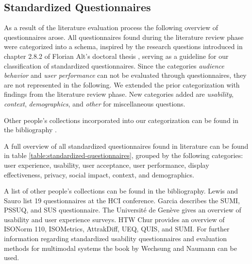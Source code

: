 \subsection{Standardized Questionnaires}
\label{section:questionnaires:categorization}

	As a result of the literature evaluation process the following overview of questionnaires arose. All questionnaires found during the literature review phase were categorized into a schema, inspired by the research questions introduced in chapter 2.8.2 of Florian Alt's doctoral thesis \cite{alt2013thesis}, serving as a guideline for our classification of standardized questionnaires. Since the categories \textit{audience behavior} and \textit{user performance} can not be evaluated through questionnaires, they are not represented in the following. We extended the prior categorization with findings from the literature review phase. New categories added are \textit{usability}, \textit{context}, \textit{demographics}, and \textit{other} for miscellaneous questions.

	Other people's collections incorporated into our categorization can be found in the bibliography \cite{Lewis2013HCI, Garcia2013UXResearch, Geneve2014Wiki, Chur2014Questionnaires, wechsung2008evaluation}. 

	A full overview of all standardized questionnaires found in literature can be found in table \ref{table:standardized-questionnaires}, grouped by the following categories: user experience, usability, user acceptance, user performance, display effectiveness, privacy, social impact, context, and demographics.



		A list of other people's collections can be found in the bibliography. Lewis and Sauro \cite{Lewis2013HCI} list 19 questionnaires at the HCI conference. Garcia \cite{Garcia2013UXResearch} describes the SUMI, PSSUQ, and SUS questionnaire. The Universit{\'e} de Gen{\`e}ve \cite{Geneve2014Wiki} gives an overview of usability and user experience surveys. HTW Chur \cite{Chur2014Questionnaires} provides an overview of ISONorm 110, ISOMetrics, AttrakDiff, UEQ, QUIS, and SUMI. For further information regarding standardized usability questionnaires and evaluation methods for multimodal systems the book by Wechsung and Naumann \cite{wechsung2008evaluation} can be used. 





